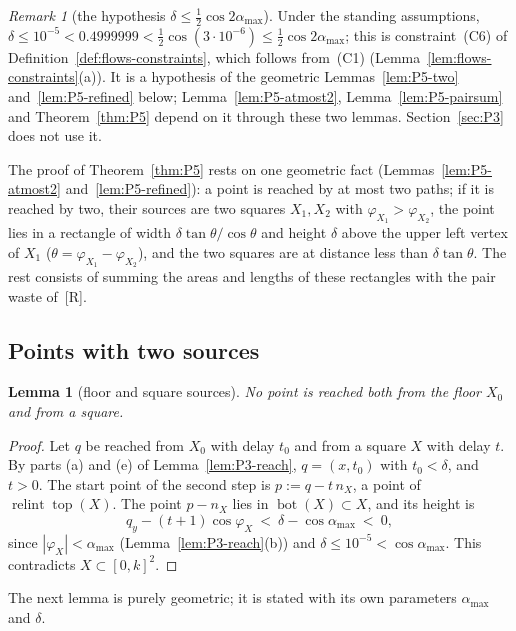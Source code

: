 \documentclass[11pt]{amsart}
\newcommand{\relint}{\operatorname{relint}}
\newcommand{\Bot}{\operatorname{bot}}
\newcommand{\Top}{\operatorname{top}}
\newcommand{\amax}{\alpha_{\max}}
\newtheorem{lemma}[theorem]{Lemma}
\theoremstyle{definition}
\theoremstyle{remark}
\newtheorem{remark}[theorem]{Remark}
\numberwithin{equation}{section}
\begin{document}
\begin{remark}[the hypothesis $\delta\le\frac12\cos2\amax$]\label{rem:P5-C6}
Under the standing assumptions, $\delta\le10^{-5}<0.4999999<\frac12\cos(3\cdot10^{-6})\le\frac12\cos2\amax$; this is constraint~(C6) of Definition~\ref{def:flows-constraints}, which follows from~(C1) (Lemma~\ref{lem:flows-constraints}(a)). It is a hypothesis of the geometric Lemmas~\ref{lem:P5-two} and~\ref{lem:P5-refined} below; Lemma~\ref{lem:P5-atmost2}, Lemma~\ref{lem:P5-pairsum} and Theorem~\ref{thm:P5} depend on it through these two lemmas. Section~\ref{sec:P3} does not use it.
\end{remark}

The proof of Theorem~\ref{thm:P5} rests on one geometric fact (Lemmas~\ref{lem:P5-atmost2} and~\ref{lem:P5-refined}): a point is reached by at most two paths; if it is reached by two, their sources are two squares $X_1,X_2$ with $\varphi_{X_1}>\varphi_{X_2}$, the point lies in a rectangle of width $\delta\tan\theta/\cos\theta$ and height $\delta$ above the upper left vertex of $X_1$ ($\theta=\varphi_{X_1}-\varphi_{X_2}$), and the two squares are at distance less than $\delta\tan\theta$. The rest consists of summing the areas and lengths of these rectangles with the pair waste of~[R].

\subsection{Points with two sources}\label{ssec:P5-two}

\begin{lemma}[floor and square sources]\label{lem:P5-floor}
No point is reached both from the floor $X_0$ and from a square.
\end{lemma}

\begin{proof}
Let $q$ be reached from $X_0$ with delay $t_0$ and from a square $X$ with delay $t$. By parts (a) and (e) of Lemma~\ref{lem:P3-reach}, $q=(x,t_0)$ with $t_0<\delta$, and $t>0$. The start point of the second step is $p:=q-t\,n_X$, a point of $\relint\Top(X)$. The point $p-n_X$ lies in $\Bot(X)\subset X$, and its height is
\[
q_y-(t+1)\cos\varphi_X\ <\ \delta-\cos\amax\ <\ 0,
\]
since $|\varphi_X|<\amax$ (Lemma~\ref{lem:P3-reach}(b)) and $\delta\le10^{-5}<\cos\amax$. This contradicts $X\subset[0,k]^2$.
\end{proof}

The next lemma is purely geometric; it is stated with its own parameters $\amax$ and $\delta$.
\end{document}
